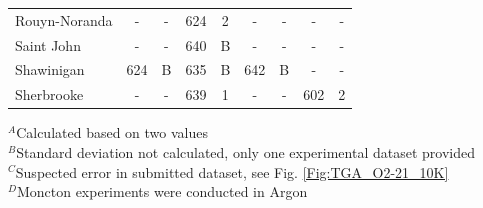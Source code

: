 \documentclass{book}
\begin{document}
\begin{table}[p]
\begin{center}
\begin{tabular}{|l|cc|cc|cc|cc|}
Rouyn-Noranda           & -           & -               & 624            & 2                & -          & -                 & -           & -                     \\
Saint John              & -           & -               & 640            & B                & -          & -                 & -           & -                     \\
Shawinigan              & 624         & B               & 635            & B                & 642        & B                 & -           & -                     \\
Sherbrooke              & -           & -               & 639            & 1                & -          & -                 & 602         & 2                     \\  \hline
\end{tabular}
\end{center}
$^A$Calculated based on two values \\
$^B$Standard deviation not calculated, only one experimental dataset provided \\
$^C$Suspected error in submitted dataset, see Fig. \ref{Fig:TGA_O2-21_10K}\\
$^D$Moncton experiments were conducted in Argon
\end{table}
\end{document}
